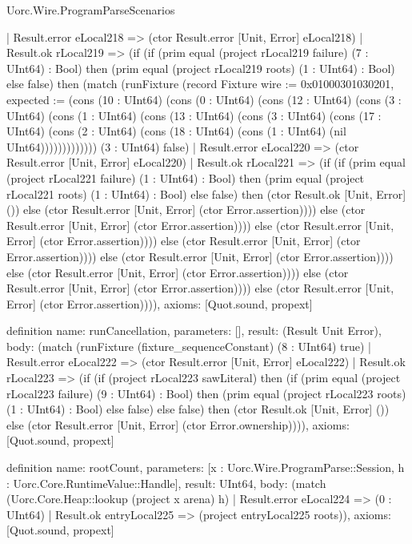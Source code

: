 \begin{lexlean}{Uorc.Wire.ProgramParseScenarios}
\begin{semanticmodule}
{                | Result.error eLocal218 => (ctor Result.error [Unit, Error] eLocal218)
                | Result.ok rLocal219 => (if (if (prim equal (project rLocal219 failure) (7 : UInt64) : Bool) then (prim equal (project rLocal219 roots) (1 : UInt64) : Bool) else false) then (match (runFixture (record Fixture {wire := 0x01000301030201, expected := (cons (10 : UInt64) (cons (0 : UInt64) (cons (12 : UInt64) (cons (3 : UInt64) (cons (1 : UInt64) (cons (13 : UInt64) (cons (3 : UInt64) (cons (17 : UInt64) (cons (2 : UInt64) (cons (18 : UInt64) (cons (1 : UInt64) (nil UInt64))))))))))))}) (3 : UInt64) false)
                  | Result.error eLocal220 => (ctor Result.error [Unit, Error] eLocal220)
                  | Result.ok rLocal221 => (if (if (prim equal (project rLocal221 failure) (1 : UInt64) : Bool) then (prim equal (project rLocal221 roots) (1 : UInt64) : Bool) else false) then (ctor Result.ok [Unit, Error] ()) else (ctor Result.error [Unit, Error] (ctor Error.assertion)))) else (ctor Result.error [Unit, Error] (ctor Error.assertion)))) else (ctor Result.error [Unit, Error] (ctor Error.assertion)))) else (ctor Result.error [Unit, Error] (ctor Error.assertion)))) else (ctor Result.error [Unit, Error] (ctor Error.assertion)))) else (ctor Result.error [Unit, Error] (ctor Error.assertion)))) else (ctor Result.error [Unit, Error] (ctor Error.assertion)))) else (ctor Result.error [Unit, Error] (ctor Error.assertion)))),
  axioms: [Quot.sound, propext]
}

definition{
  name: runCancellation,
  parameters: [],
  result: (Result Unit Error),
  body: (match (runFixture (fixture_sequenceConstant) (8 : UInt64) true)
    | Result.error eLocal222 => (ctor Result.error [Unit, Error] eLocal222)
    | Result.ok rLocal223 => (if (if (project rLocal223 sawLiteral) then (if (prim equal (project rLocal223 failure) (9 : UInt64) : Bool) then (prim equal (project rLocal223 roots) (1 : UInt64) : Bool) else false) else false) then (ctor Result.ok [Unit, Error] ()) else (ctor Result.error [Unit, Error] (ctor Error.ownership)))),
  axioms: [Quot.sound, propext]
}

definition{
  name: rootCount,
  parameters: [x : Uorc.Wire.ProgramParse::Session, h : Uorc.Core.RuntimeValue::Handle],
  result: UInt64,
  body: (match (Uorc.Core.Heap::lookup (project x arena) h)
    | Result.error eLocal224 => (0 : UInt64)
    | Result.ok entryLocal225 => (project entryLocal225 roots)),
  axioms: [Quot.sound, propext]
}


\end{semanticmodule}
\end{lexlean}
